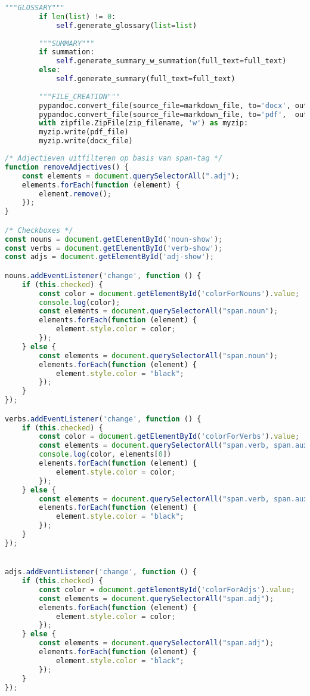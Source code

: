 \begin{lstlisting}[language=Python, caption={Writer-klasse omvattende de code om dynamische PDF- en Word-documenten te genereren.}, label={code:writer-klasse}]
		"""GLOSSARY"""
		if len(list) != 0:
			self.generate_glossary(list=list)
		
		"""SUMMARY"""
		if summation:
			self.generate_summary_w_summation(full_text=full_text)
		else:
			self.generate_summary(full_text=full_text)
	
		"""FILE_CREATION"""
		pypandoc.convert_file(source_file=markdown_file, to='docx', outputfile=docx_file,   extra_args=["-M2GB", "+RTS", "-K64m", "-RTS"])
		pypandoc.convert_file(source_file=markdown_file, to='pdf',  outputfile=pdf_file,    extra_args=['--pdf-engine=xelatex'])
		with zipfile.ZipFile(zip_filename, 'w') as myzip:
		myzip.write(pdf_file)
		myzip.write(docx_file)
\end{lstlisting}

\begin{lstlisting}[language=JavaScript, caption={De toegepaste scripts voor het verwijderen van adjectieven en togglen van type woorden.}, label={code:js-toggle-adjectives-nouns-verbs}]
/* Adjectieven uitfilteren op basis van span-tag */
function removeAdjectives() {
	const elements = document.querySelectorAll(".adj");
	elements.forEach(function (element) {
		element.remove();
	});
}

/* Checkboxes */
const nouns = document.getElementById('noun-show');
const verbs = document.getElementById('verb-show');
const adjs = document.getElementById('adj-show');

nouns.addEventListener('change', function () {
	if (this.checked) {
		const color = document.getElementById('colorForNouns').value;
		console.log(color);
		const elements = document.querySelectorAll("span.noun");
		elements.forEach(function (element) {
			element.style.color = color;
		});
	} else {
		const elements = document.querySelectorAll("span.noun");
		elements.forEach(function (element) {
			element.style.color = "black";
		});
	}
});

verbs.addEventListener('change', function () {
	if (this.checked) {
		const color = document.getElementById('colorForVerbs').value;
		const elements = document.querySelectorAll("span.verb, span.aux");
		console.log(color, elements[0])
		elements.forEach(function (element) {
			element.style.color = color;
		});
	} else {
		const elements = document.querySelectorAll("span.verb, span.aux");
		elements.forEach(function (element) {
			element.style.color = "black";
		});
	}
});


adjs.addEventListener('change', function () {
	if (this.checked) {
		const color = document.getElementById('colorForAdjs').value;
		const elements = document.querySelectorAll("span.adj");
		elements.forEach(function (element) {
			element.style.color = color;
		});
	} else {
		const elements = document.querySelectorAll("span.adj");
		elements.forEach(function (element) {
			element.style.color = "black";
		});
	}
});
\end{lstlisting}

